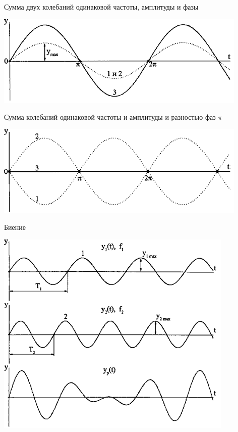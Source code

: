\documentclass{beamer}
\begin{document}
\begin{frame}
\begin{block}{Сумма двух колебаний одинаковой частоты, амплитуды и фазы}
\begin{center}
\includegraphics[scale=0.8]{pic-interferention-02}
\end{center}
\end{block}
\begin{block}{Сумма колебаний одинаковой частоты и амплитуды и разностью фаз \(\pi\)}
\begin{center}
\includegraphics[scale=0.8]{pic-interferention-03}
\end{center}
\end{block}
\end{frame}

\begin{frame}
\begin{block}{Биение}
\begin{center}
\includegraphics[scale=0.8]{pic-interferention-04}
\end{center}
\end{block}
\end{frame}
\end{document}
